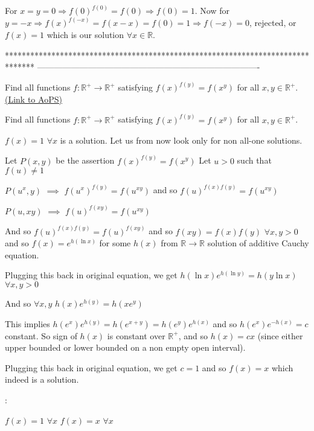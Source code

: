 \begin{solution}
	For $x=y=0 \Rightarrow f(0)^{f(0)}=f(0) \Rightarrow f(0)=1$.
Now for $y=-x\Rightarrow f(x)^{f(-x)}=f(x-x)=f(0)=1 \Rightarrow f(-x)=0$, rejected, or $f(x)=1$ which is our solution $\forall x \in \mathbb{R}$.
\end{solution}
*******************************************************************************
-------------------------------------------------------------------------------

\begin{problem}
	Find all functions $f : \mathbb{R}^+ \rightarrow \mathbb{R}^+$ satisfying $f(x)^{f(y)} = f(x^y)$ for all $x,y \in \mathbb{R}^+$.
	\flushright \href{https://artofproblemsolving.com/community/c6h480079}{(Link to AoPS)}
\end{problem}



\begin{solution}
	\begin{tcolorbox}Find all functions $f : \mathbb{R}^+ \rightarrow \mathbb{R}^+$ satisfying $f(x)^{f(y)} = f(x^y)$ for all $x,y \in \mathbb{R}^+$.\end{tcolorbox}
$f(x)=1$ $\forall x$ is a solution. Let us from now look only for non all-one solutions.

Let $P(x,y)$ be the assertion $f(x)^{f(y)}=f(x^y)$
Let $u>0$ such that $f(u)\ne 1$

$P(u^x,y)$ $\implies$ $f(u^x)^{f(y)}=f(u^{xy})$ and so $f(u)^{f(x)f(y)}=f(u^{xy})$ 

$P(u,xy)$ $\implies$ $f(u)^{f(xy)}=f(u^{xy})$

And so $f(u)^{f(x)f(y)}=f(u)^{f(xy)}$ and so $f(xy)=f(x)f(y)$ $\forall x,y>0$ and so $f(x)=e^{h(\ln x)}$ for some $h(x)$ from $\mathbb R\to\mathbb R$ solution of additive Cauchy equation.

Plugging this back in original equation, we get $h(\ln x)e^{h(\ln y)}=h(y\ln x)$ $\forall x,y>0$

And so  $\forall x,y$ $h(x)e^{h(y)}=h(xe^y)$

This implies $h(e^x)e^{h(y)}=h(e^{x+y})=h(e^y)e^{h(x)}$ and so $h(e^x)e^{-h(x)}=c$ constant.
So sign of $h(x)$ is constant over $\mathbb R^+$, and so $h(x)=cx$ (since either upper bounded or lower bounded on a non empty open interval).

Plugging this back in original equation, we get $c=1$ and so $f(x)=x$ which indeed is a solution.

 :

$f(x)=1$ $\forall x$
$f(x)=x$ $\forall x$
\end{solution}



